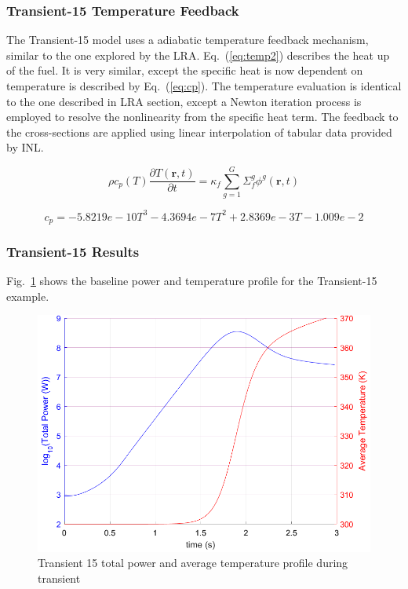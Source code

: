 \documentclass{anstrans}
\renewcommand{\vec}[1]{\bm{#1}} %
\newcommand{\eqt}[1]{Eq.~(\ref{#1})}                     %
\newcommand{\fig}[1]{Fig.~\ref{#1}}                      %
\newcommand{\be}{\begin{equation}}
\newcommand{\ee}{\end{equation}}
\begin{document}
\subsubsection{Transient-15 Temperature Feedback}

The Transient-15 model uses a adiabatic temperature feedback mechanism, similar to the one explored by the LRA. \eqt{eq:temp2} describes the heat up of the fuel.  It is very similar, except the specific heat is now dependent on temperature is described by \eqt{eq:cp}.  The temperature evaluation is identical to the one described in LRA section, except a Newton iteration process is employed to resolve the nonlinearity from the specific heat term.  The feedback to the cross-sections are applied using linear interpolation of tabular data provided by INL.

\be
\rho c_p(T) \frac{\partial T(\vec{r},t)}{\partial t} = \kappa_f \sum^G_{g=1}\Sigma_f^g \phi^g(\vec{r},t)
\label{eq:temp2}
\ee

\be
c_p = -5.8219e-10T^3 - 4.3694e-7T^2 + 2.8369e-3T -1.009e-2
\label{eq:cp}
\ee

\subsubsection{Transient-15 Results}

\fig{fig:Tran15_profile} shows the baseline power and temperature profile for the Transient-15 example.

\begin{figure}[htbp!]
\centering
\includegraphics[width=\linewidth]{Tran15_profile.png}
\caption{Transient 15 total power and average temperature profile during transient}
\label{fig:Tran15_profile}
\end{figure}
\end{document}
